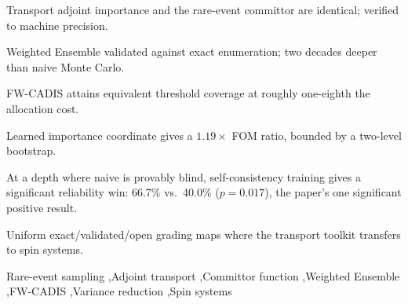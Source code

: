 \documentclass[a4paper,fleqn]{cas-sc}
\begin{document}
	
	\begin{abstract}
		Radiation transport's adjoint importance function and CADIS/weight window machinery mathematically identical to the rare-event committor are transferred to statistical mechanics and tested end-to-end on the 2D Ising ferromagnet and Edwards–Anderson spin glass. The adjoint committor identity is verified to machine precision, and Weighted Ensemble sampling (weight windows on spin configurations) reaches two decades deeper into the tail than naive Monte Carlo at matched cost. A self consistency training objective shaped directly on the harmonic committor condition finds rare events significantly more often than a hand-picked energy coordinate (66.7\% vs. 40.0\% hit rate, p = 0.017). A global variance reduction objective (FW-CADIS) achieves an eightfold cost reduction while matching uniform allocation's error profile. These results demonstrate the transport toolkit's effectiveness in the genuinely rare regime, and highlight the importance of a committor-shaped training objective rather than a convenient proxy.
	\end{abstract}
	\begin{highlights}
		\item Transport adjoint importance and the rare-event committor are identical; verified to machine precision.
		\item Weighted Ensemble validated against exact enumeration; two decades deeper than naive Monte Carlo.
		\item FW-CADIS attains equivalent threshold coverage at roughly one-eighth the allocation cost.
		\item Learned importance coordinate gives a $1.19\times$ FOM ratio, bounded by a two-level bootstrap.
		\item At a depth where naive is provably blind, self-consistency training gives a significant reliability win: 66.7\% vs.\ 40.0\% ($p=0.017$), the paper's one significant positive result.
		\item Uniform exact/validated/open grading maps where the transport toolkit transfers to spin systems.
	\end{highlights}
	
	\begin{keywords}
		Rare-event sampling \sep Adjoint transport \sep Committor function \sep Weighted Ensemble \sep FW-CADIS \sep Variance reduction \sep Spin systems
	\end{keywords}
	
\end{document}
